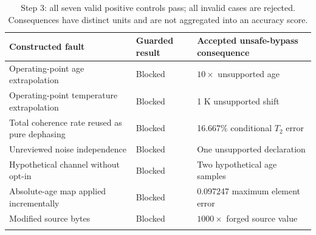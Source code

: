 {\small\begin{longtable}{p{.37\linewidth}p{.16\linewidth}p{.38\linewidth}}\toprule Constructed fault & Guarded result & Accepted unsafe-bypass consequence\\\midrule\endhead
Operating-point age extrapolation & Blocked & $10\times$ unsupported age\\
Operating-point temperature extrapolation & Blocked & 1 K unsupported shift\\
Total coherence rate reused as pure dephasing & Blocked & 16.667\% conditional $T_2$ error\\
Unreviewed noise independence & Blocked & One unsupported declaration\\
Hypothetical channel without opt-in & Blocked & Two hypothetical age samples\\
Absolute-age map applied incrementally & Blocked & 0.097247 maximum element error\\
Modified source bytes & Blocked & $1000\times$ forged source value\\\bottomrule\caption{Step 3: all seven valid positive controls pass; all invalid cases are rejected. Consequences have distinct units and are not aggregated into an accuracy score.}\label{tab:systemfaults}\end{longtable}}
